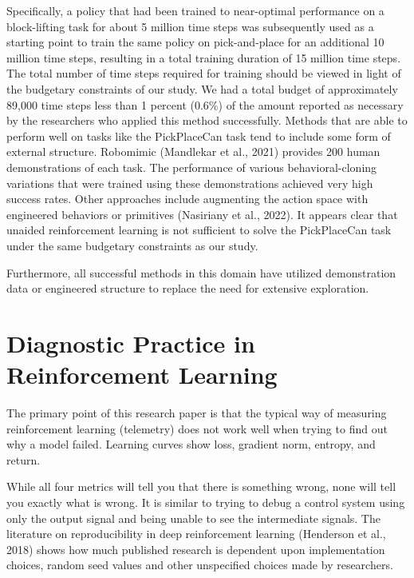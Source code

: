 \documentclass[12pt,a4paper,oneside]{report}
\begin{document}
Specifically, a policy that had been trained to near-optimal performance on a block-lifting task for about 5 million time steps was subsequently used as a starting point to train the same policy on pick-and-place for an additional 10 million time steps, resulting in a total training duration of 15 million time steps. The total number of time steps required for training should be viewed in light of the budgetary constraints of our study. We had a total budget of approximately 89,000 time steps less than 1 percent (0.6\%) of the amount reported as necessary by the researchers who applied this method successfully. Methods that are able to perform well on tasks like the PickPlaceCan task tend to include some form of external structure. Robomimic (Mandlekar et al., 2021) provides 200 human demonstrations of each task. The performance of various behavioral-cloning variations that were trained using these demonstrations achieved very high success rates. Other approaches include augmenting the action space with engineered behaviors or primitives (Nasiriany et al., 2022). It appears clear that unaided reinforcement learning is not sufficient to solve the PickPlaceCan task under the same budgetary constraints as our study.

Furthermore, all successful methods in this domain have utilized demonstration data or engineered structure to replace the need for extensive exploration.


\hypertarget{diagnostic-practice-in-reinforcement-learning}{%
\section{Diagnostic Practice in Reinforcement Learning}\label{diagnostic-practice-in-reinforcement-learning}}

The primary point of this research paper is that the typical way of measuring reinforcement learning (telemetry) does not work well when trying to find out why a model failed. Learning curves show loss, gradient norm, entropy, and return.

While all four metrics will tell you that there is something wrong, none will tell you exactly what is wrong. It is similar to trying to debug a control system using only the output signal and being unable to see the intermediate signals. The literature on reproducibility in deep reinforcement learning (Henderson et al., 2018) shows how much published research is dependent upon implementation choices, random seed values and other unspecified choices made by researchers.
\end{document}

